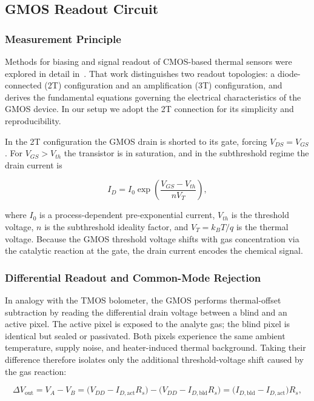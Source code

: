 \documentclass{report}
\begin{document}
\subsection{GMOS Readout Circuit}

\subsubsection{Measurement Principle}

Methods for biasing and signal readout of CMOS-based thermal sensors were
explored in detail in~\cite{TODO}. That work distinguishes two readout
topologies: a diode-connected (2T) configuration and an amplification (3T)
configuration, and derives the fundamental equations governing the electrical
characteristics of the GMOS device. In our setup we adopt the 2T connection
for its simplicity and reproducibility.

In the 2T configuration the GMOS drain is shorted to its gate, forcing
$V_{DS} = V_{GS}$. For $V_{GS} > V_{th}$ the transistor is in saturation,
and in the subthreshold regime the drain current is

\begin{equation}
  I_D = I_0 \exp\!\left(\frac{V_{GS} - V_{th}}{n V_T}\right),
  \label{eq:subthreshold}
\end{equation}

where $I_0$ is a process-dependent pre-exponential current, $V_{th}$ is the
threshold voltage, $n$ is the subthreshold ideality factor, and
$V_T = k_B T / q$ is the thermal voltage. Because the GMOS threshold voltage
shifts with gas concentration via the catalytic reaction at the gate, the
drain current encodes the chemical signal.

\subsubsection{Differential Readout and Common-Mode Rejection}

In analogy with the TMOS bolometer, the GMOS performs thermal-offset
subtraction by reading the differential drain voltage between a blind and an
active pixel. The active pixel is exposed to the analyte gas; the blind pixel
is identical but sealed or passivated. Both pixels experience the same
ambient temperature, supply noise, and heater-induced thermal background.
Taking their difference therefore isolates only the additional
threshold-voltage shift caused by the gas reaction:

\begin{equation}
  \Delta V_{\mathrm{out}} = V_A - V_B
    = \bigl(V_{DD} - I_{D,\mathrm{act}} R_s\bigr)
    - \bigl(V_{DD} - I_{D,\mathrm{bld}} R_s\bigr)
    = \bigl(I_{D,\mathrm{bld}} - I_{D,\mathrm{act}}\bigr) R_s,
  \label{eq:differential}
\end{equation}
\end{document}
